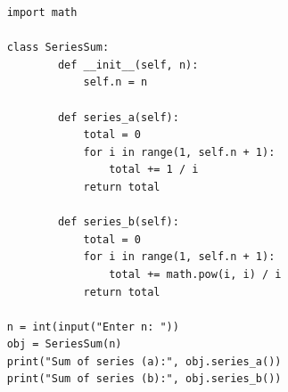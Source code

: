 \begin{verbatim}
    import math

    class SeriesSum:
            def __init__(self, n):
                self.n = n
        
            def series_a(self):
                total = 0
                for i in range(1, self.n + 1):
                    total += 1 / i
                return total
        
            def series_b(self):
                total = 0
                for i in range(1, self.n + 1):
                    total += math.pow(i, i) / i
                return total
        
    n = int(input("Enter n: "))
    obj = SeriesSum(n)
    print("Sum of series (a):", obj.series_a())
    print("Sum of series (b):", obj.series_b())
\end{verbatim}